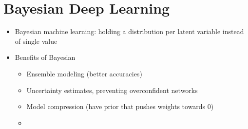 \section{Bayesian Deep Learning}
\begin{itemize}
	\item Bayesian machine learning: holding a distribution per latent variable instead of single value
	\item Benefits of Bayesian
	\begin{itemize}
		\item Ensemble modeling (better accuracies)
		\item Uncertainty estimates, preventing overconfident networks
		\item Model compression (have prior that pushes weights towards 0)
		\item {}
	\end{itemize}
\end{itemize}
